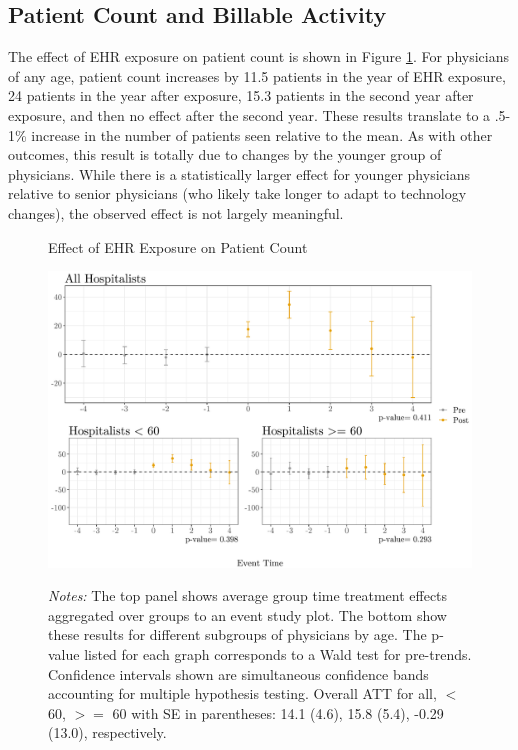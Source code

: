 \documentclass[11pt]{article}
\begin{document}
\subsection{Patient Count and Billable Activity}\label{sec:patientcount}

The effect of EHR exposure on patient count is shown in Figure \ref{fig:patient}. For physicians of any age, patient count increases by 11.5 patients in the year of EHR exposure, 24 patients in the year after exposure, 15.3 patients in the second year after exposure, and then no effect after the second year. These results translate to a .5-1\% increase in the number of patients seen relative to the mean. As with other outcomes, this result is totally due to changes by the younger group of physicians. While there is a statistically larger effect for younger physicians relative to senior physicians (who likely take longer to adapt to technology changes), the observed effect is not largely meaningful. 

\begin{figure}[ht]
    \centering
    \caption{Effect of EHR Exposure on Patient Count}
    \includegraphics[scale=.65]{Objects/patient_plot.pdf}
    \label{fig:patient}
    \vspace{2mm}
    \caption*{\footnotesize{\textit{Notes:} The top panel shows average group time treatment effects aggregated over groups to an event study plot. The bottom show these results for different subgroups of physicians by age. The p-value listed for each graph corresponds to a Wald test for pre-trends. Confidence intervals shown are simultaneous confidence bands accounting for multiple hypothesis testing. Overall ATT for all, $<$ 60, $>=$ 60 with SE in parentheses: 14.1 (4.6), 15.8 (5.4), -0.29 (13.0), respectively.}}
\end{figure}
\end{document}
